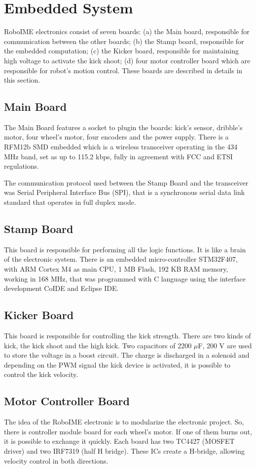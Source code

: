 \section{Embedded System}\label{emb_sys_sec}
RoboIME electronics consist of seven boards: (a) the Main board, responsible for communication between the other boards; (b) the Stamp board,
responsible  for the embedded computation; (c) the Kicker board, responsible for maintaining high voltage to activate the kick shoot;
(d) four motor controller board which are responsible for robot's motion control. These boards are described in details in this section.

\subsection{Main Board}
The Main Board features a socket to plugin the boards: kick's sensor, dribble's motor, four wheel's motor, four encoders and the power supply.
There is a RFM12b SMD embedded which is a wireless transceiver operating in the 434 MHz band, set as up to 115.2 kbps, fully in agreement
with FCC and ETSI regulations.

The communication protocol used between the Stamp Board and the transceiver was Serial Peripheral Interface Bus (SPI), that  is a synchronous
serial data link standard that operates in full duplex mode.

\subsection{Stamp Board}
This board is responsible  for performing all the logic functions. It is like a brain of the electronic system. There is an embedded micro-controller STM32F407,
with ARM Cortex M4 as main CPU, 1 MB Flash, 192 KB RAM memory, working in 168 MHz, that was programmed with C language using the  interface development
CoIDE and Eclipse IDE.

\subsection{Kicker Board}
This board is responsible for controlling the kick strength. There are two kinds of kick,
the kick shoot and the high kick. Two capacitors of 2200 $\mu$F, 200 V are used to store the
voltage in a boost circuit. The charge is discharged in a solenoid and depending on the PWM
signal the kick device is activated, it is possible to control the kick velocity.


\subsection{Motor Controller Board}
The idea of the RoboIME electronic is to modularize the electronic project. So, there
is controller module board for each wheel's motor. If one of them burns out, it is
possible to exchange it quickly. Each board has two TC4427 (MOSFET driver) and two
IRF7319 (half H bridge). These ICs create a H-bridge, allowing velocity control in
both directions.

